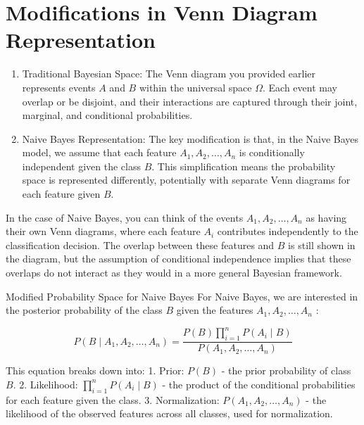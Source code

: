 \documentclass[
  12 pt,
  a4paper,
]{book}
\providecommand{\tightlist}{%
  \setlength{\itemsep}{0pt}\setlength{\parskip}{0pt}}
\numberwithin{equation}{section}
\theoremstyle{plain}      %
\theoremstyle{definition} %
\theoremstyle{remark}     %
\theoremstyle{note}         %
\begin{document}
\normalsize

\newpage

\newpage

\hypertarget{modifications-in-venn-diagram-representation}{%
\section{Modifications in Venn Diagram
Representation}\label{modifications-in-venn-diagram-representation}}

\begin{enumerate}
\def\labelenumi{\arabic{enumi}.}
\tightlist
\item
  Traditional Bayesian Space: The Venn diagram you provided earlier
  represents events \(A\) and \(B\) within the universal space
  \(\Omega\). Each event may overlap or be disjoint, and their
  interactions are captured through their joint, marginal, and
  conditional probabilities.
\item
  Naive Bayes Representation: The key modification is that, in the Naive
  Bayes model, we assume that each feature \(A_1, A_2, \ldots, A_n\) is
  conditionally independent given the class \(B\). This simplification
  means the probability space is represented differently, potentially
  with separate Venn diagrams for each feature given \(B\).
\end{enumerate}

In the case of Naive Bayes, you can think of the events
\(A_1, A_2, \ldots, A_n\) as having their own Venn diagrams, where each
feature \(A_i\) contributes independently to the classification
decision. The overlap between these features and \(B\) is still shown in
the diagram, but the assumption of conditional independence implies that
these overlaps do not interact as they would in a more general Bayesian
framework.

Modified Probability Space for Naive Bayes For Naive Bayes, we are
interested in the posterior probability of the class \(B\) given the
features \(A_1, A_2, \ldots, A_n\) :

\[
P\left(B \mid A_1, A_2, \ldots, A_n\right)=\frac{P(B) \prod_{i=1}^n P\left(A_i \mid B\right)}{P\left(A_1, A_2, \ldots, A_n\right)}
\]

This equation breaks down into: 1. Prior: \(P(B)\) - the prior
probability of class \(B\). 2. Likelihood:
\(\prod_{i=1}^n P\left(A_i \mid B\right)\) - the product of the
conditional probabilities for each feature given the class. 3.
Normalization: \(P\left(A_1, A_2, \ldots, A_n\right)\) - the likelihood
of the observed features across all classes, used for normalization.
\end{document}
